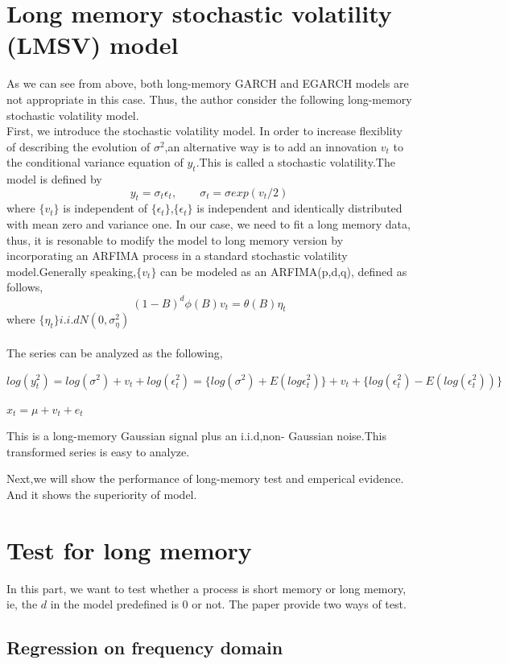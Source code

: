 \documentclass[10pt,a4paper]{article}
\begin{document}
\section{Long memory stochastic volatility (LMSV) model}
As we can see from above, both long-memory GARCH and EGARCH models are not appropriate in this case. Thus, the author consider the following long-memory stochastic volatility model. \\
First, we introduce the stochastic volatility model. 
In order to increase flexiblity of describing the evolution of $\sigma^2$,an alternative way is to add an innovation $v_t$ to the conditional variance equation of $y_t$.This is called a stochastic volatility.The model is defined by
$$y_t=\sigma_t\epsilon_t, \qquad \sigma_t=\sigma exp(v_t/2)$$
where {$\{v_t\}$} is independent of {$\{\epsilon_t\}$},{$\{\epsilon_t\}$} is independent and identically distributed with mean zero and variance one.
In our case, we need to fit a long memory data, thus, it is resonable to modify the model to long memory version by incorporating an ARFIMA process in a standard stochastic volatility model.Generally speaking,$\{v_t\}$ can be modeled as an ARFIMA(p,d,q),\cite{baillie1996long} defined as follows,
$$(1-B)^d\phi(B)v_t=\theta(B)\eta_t$$
where $\{\eta_t\} i.i.d N(0,\sigma_\eta^2)$ \\\\
The series can be analyzed as the following,
\begin{center}$\displaystyle log(y^2_t)=log(\sigma^2)+v_t+log(\epsilon^2_t)=\{log(\sigma^2)+E(log\epsilon^2_t)\}+v_t+\{log(\epsilon^2_t)-E(log(\epsilon^2_t))\}$\end{center}
\begin{center} $\displaystyle x_t=\mu+v_t+e_t$\end{center}
This is a long-memory Gaussian signal plus an i.i.d,non- Gaussian noise.This transformed series is easy to analyze.

Next,we will show the performance of long-memory test and emperical evidence. And it shows the superiority of model.
\section{Test for long memory}
In this part, we want to test whether a process is short 
 memory or long memory, ie, the $d$ in the model predefined is 0 or not. The paper provide two ways of test.
\subsection{Regression on frequency domain}
\end{document}
